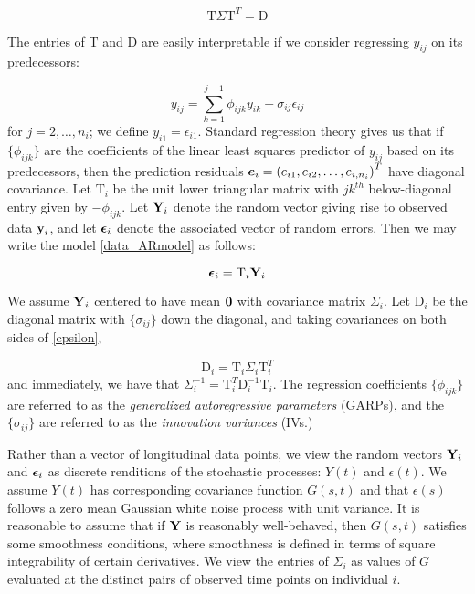 \documentclass[12pt]{article}
\newcommand{\bfeps}{\mbox{\boldmath $\epsilon$}}
\newcommand{\bfe}{\mbox{\boldmath $e$}}
\newcommand{\bfo}{\mbox{\boldmath $0$}}
\newcommand{\bfy}{\mbox{\bf y}}
\newcommand{\bfY}{\mbox{\bf Y}}
\newcommand{\matD}{\mbox{D}}
\newcommand{\matT}{\mbox{T}}
\begin{document}
\begin{equation}
\nonumber \matT \Sigma \matT^T = \matD
\end{equation}
\noindent

The entries of $\matT$ and $\matD$ are easily interpretable if we consider regressing $y_{ij}$ on its predecessors: 

\begin{equation}
{y}_{ij}  = \sum_{k=1}^{j-1} \phi_{ijk} y_{ik} + \sigma_{ij}\epsilon_{ij} \label{data_ARmodel}
\end{equation}
\noindent
for $j=2,\dots,n_i$; we define $y_{i1}=\epsilon_{i1}$. Standard regression theory gives us that if $\lbrace \phi_{ijk} \rbrace$ are the coefficients of the linear least squares predictor of $y_{ij}$ based on its predecessors, then the prediction residuals $\bfe_i =\left( e_{i1}, e_{i2},\dots, e_{i,n_i} \right)^T$ have diagonal covariance. Let $\matT_i$ be the unit lower triangular matrix with $jk^{th}$ below-diagonal entry given by $-\phi_{ijk}$. Let $\bfY_i$ denote the random vector giving rise to observed data $\bfy_i$, and let $\bfeps_i$ denote the associated vector of random errors. Then we may write the model \eqref{data_ARmodel} as follows: 

\begin{equation}
\bfeps_i = \matT_i \bfY_i \label{epsilon}
\end{equation}

We assume $\bfY_i$ centered to have mean $\bfo$ with covariance matrix $\Sigma_i$. Let $\matD_i$ be the diagonal matrix with $\lbrace \sigma_{ij} \rbrace$ down the diagonal, and taking covariances on both sides of \eqref{epsilon}, 

\begin{equation}
\nonumber
\matD_i = \matT_i \Sigma_i \matT_i^T
\end{equation} 
\noindent
and immediately, we have that $\Sigma_i^{-1} = \matT_i^T \matD_i^{-1} \matT_i$. The regression coefficients $\lbrace \phi_{ijk} \rbrace$ are referred to as the \emph{generalized autoregressive parameters} (GARPs), and the $\lbrace \sigma_{ij} \rbrace$ are referred to as the \emph{innovation variances} (IVs.) 


Rather than a vector of longitudinal data points, we view the random vectors $\bfY_i$ and $\bfeps_i$ as discrete renditions of the stochastic processes: $Y\left(t\right)$ and $\epsilon\left(t\right)$.  We assume $Y\left(t\right)$ has corresponding covariance function $G\left(s,t\right)$ and that $\epsilon\left(s\right)$ follows a zero mean Gaussian white noise process with unit variance. It is reasonable to assume that if $\bfY$ is reasonably well-behaved, then $G\left(s,t\right)$ satisfies some smoothness conditions, where smoothness is defined in terms of square integrability of certain derivatives. We view the entries of $\Sigma_i$ as values of $G$ evaluated at the distinct pairs of observed time points on individual $i$. 
\end{document}
